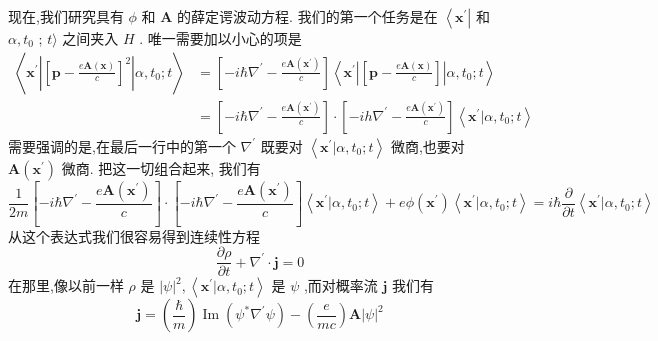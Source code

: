 \documentclass[lang=cn,newtx,10pt,scheme=chinese,thmcnt=section]{elegantbook}
\begin{document}
现在,我们研究具有 $\phi$ 和 $\mathbf{A}$ 的薛定谔波动方程. 我们的第一个任务是在 $\left\langle {\mathbf{x}}^{\prime }\right|$ 和 $\alpha ,{t}_{0}$ ; $t\rangle$ 之间夹入 $H$ . 唯一需要加以小心的项是
\begin{equation}
	\begin{aligned}
		\left\langle {{\mathbf{x}}^{\prime }\left| {\left\lbrack \mathbf{p} - \frac{e\mathbf{A}\left( \mathbf{x}\right) }{c}\right\rbrack }^{2}\right| \alpha ,{t}_{0};t}\right\rangle &= \left\lbrack {-i\hbar {\nabla }^{\prime } - \frac{e\mathbf{A}\left( {\mathbf{x}}^{\prime }\right) }{c}}\right\rbrack \left\langle {{\mathbf{x}}^{\prime }\left| \left\lbrack {\mathbf{p} - \frac{e\mathbf{A}\left( \mathbf{x}\right) }{c}}\right\rbrack \right| \alpha ,{t}_{0};t}\right\rangle\\
		&= \left\lbrack {-i\hbar {\nabla }^{\prime } - \frac{e\mathbf{A}\left( {\mathbf{x}}^{\prime }\right) }{c}}\right\rbrack \cdot \left\lbrack {-{ih}{\nabla }^{\prime } - \frac{e\mathbf{A}\left( {\mathbf{x}}^{\prime }\right) }{c}}\right\rbrack \left\langle {{\mathbf{x}}^{\prime } | \alpha ,{t}_{0};t}\right\rangle
	\end{aligned}
\end{equation}
需要强调的是,在最后一行中的第一个 ${\nabla }^{\prime }$ 既要对 $\left\langle {{\mathbf{x}}^{\prime } | \alpha ,{t}_{0};t}\right\rangle$ 微商,也要对 $\mathbf{A}\left( {\mathbf{x}}^{\prime }\right)$ 微商. 把这一切组合起来, 我们有
\begin{equation}
	\frac{1}{2m}\left\lbrack {-i\hbar {\nabla }^{\prime } - \frac{e\mathbf{A}\left( {\mathbf{x}}^{\prime }\right) }{c}}\right\rbrack \cdot \left\lbrack {-i\hbar {\nabla }^{\prime } - \frac{e\mathbf{A}\left( {\mathbf{x}}^{\prime }\right) }{c}}\right\rbrack \left\langle {{\mathbf{x}}^{\prime } | \alpha ,{t}_{0};t}\right\rangle+ {e\phi }\left( {\mathbf{x}}^{\prime }\right) \left\langle {{\mathbf{x}}^{\prime } | \alpha ,{t}_{0};t}\right\rangle = i\hbar \frac{\partial }{\partial t}\left\langle {{\mathbf{x}}^{\prime } | \alpha ,{t}_{0};t}\right\rangle
\end{equation}
从这个表达式我们很容易得到连续性方程
\begin{equation}
	\frac{\partial \rho }{\partial t} + {\nabla }^{\prime } \cdot \mathbf{j} = 0
\end{equation}
在那里,像以前一样 $\rho$ 是 ${\left| \psi \right| }^{2},\left\langle {{\mathbf{x}}^{\prime } | \alpha ,{t}_{0};t}\right\rangle$ 是 $\psi$ ,而对概率流 $\mathbf{j}$ 我们有
\begin{equation}
	\mathbf{j} = \left( \frac{\hbar }{m}\right) \operatorname{Im}\left( {{\psi }^{ * }{\nabla }^{\prime }\psi }\right) - \left( \frac{e}{mc}\right) \mathbf{A}{\left| \psi \right| }^{2}
\end{equation}
\end{document}
